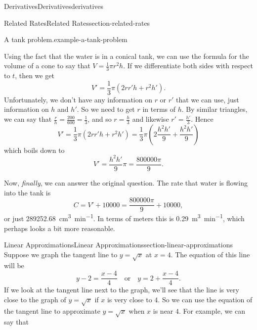 \documentclass[oneside,10pt,]{book}
\numberwithin{equation}{section}
\begin{document}
\begin{chapterptx}{Derivatives}{}{Derivatives}{}{}{derivatives}
\begin{sectionptx}{Related Rates}{}{Related Rates}{}{}{section-related-rates}
\begin{example}{A tank problem.}{example-a-tank-problem}
\par
\hypertarget{p-174}{}%
Using the fact that the water is in a conical tank, we can use the formula for the volume of a cone to say that \(V = \frac{1}{3}\pi r^{2}h\). If we differentiate both sides with respect to \(t\), then we get%
\begin{equation*}
V' = \frac{1}{3}\pi (2rr'h + r^{2}h').
\end{equation*}
Unfortunately, we don't have any information on \(r\) or \(r'\) that we can use, just information on \(h\) and \(h'\). So we need to get \(r\) in terms of \(h\). By similar triangles, we can say that \(\frac{r}{h} = \frac{200}{600} = \frac{1}{3}\), and so \(r = \frac{h}{3}\) and likewise \(r' = \frac{h'}{3}\). Hence%
\begin{equation*}
V' = \frac{1}{3}\pi (2rr'h + r^{2}h') = \frac{1}{3}\pi \left(2\frac{h^{2}h'}{9} + \frac{h^{2}h'}{9}\right)
\end{equation*}
which boils down to%
\begin{equation*}
V' = \frac{h^{2}h'}{9}\pi = \frac{800000\pi}{9}.
\end{equation*}
%
\par
\hypertarget{p-175}{}%
Now, \emph{finally}, we can answer the original question. The rate that water is flowing into the tank is%
\begin{equation*}
C = V' + 10000 = \frac{800000\pi}{9} + 10000,
\end{equation*}
or just \SI{289252.68}{\centi\meter\tothe{3}\per\minute}. In terms of meters this is \SI{.29}{\meter\tothe{3}\per\minute}, which perhaps looks a bit more reasonable.%
\end{example}
\end{sectionptx}
%
%
\typeout{************************************************}
\typeout{************************************************}
%
\begin{sectionptx}{Linear Approximations}{}{Linear Approximations}{}{}{section-linear-approximations}
\hypertarget{p-176}{}%
Suppose we graph the tangent line to \(y=\sqrt{x}\) at \(x=4\). The equation of this line will be%
\begin{equation*}
y-2 = \frac{x-4}{4}\quad\text{or}\quad y= 2 + \frac{x-4}{4}.
\end{equation*}
If we look at the tangent line next to the graph, we'll see that the line is very close to the graph of \(y=\sqrt{x}\) if \(x\) is very close to \(4\). So we can use the equation of the tangent line to approximate \(y=\sqrt{x}\) when \(x\) is near \(4\). For example, we can say that%

\end{sectionptx}
\end{chapterptx}
\end{document}
